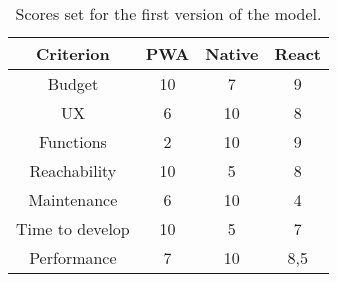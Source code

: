 \begin{table}[ht]
    \centering
    \begin{tabular}{ |c|c|c|c| } 
        \hline
        \rowcolor{light-gray}
        Criterion & PWA & Native & React \\
        \hline
        Budget & 10 & 7 & 9\\ 
        \hline
        UX & 6 & 10 & 8\\ 
        \hline
        Functions & 2 & 10 & 9\\ 
        \hline
        Reachability & 10 & 5 & 8\\
        \hline
        Maintenance & 6 & 10 & 4\\
        \hline
        Time to develop & 10 & 5 & 7\\
        \hline
        Performance & 7 & 10 & 8,5\\
        \hline
    \end{tabular}
    \caption{\label{tab:model-score-v1}Scores set for the first version of the model.}
\end{table}